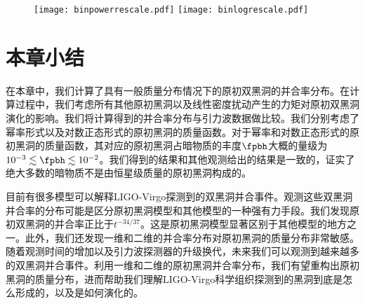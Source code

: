 \begin{figure}[htb]
    \centering
    \texttt{[image: binpowerrescale.pdf]}
    \texttt{[image: binlogrescale.pdf]}
\end{figure}

\section{本章小结}
在本章中，我们计算了具有一般质量分布情况下的原初双黑洞的并合率分布。在计算过程中，我们考虑所有其他原初黑洞以及线性密度扰动产生的力矩对原初双黑洞演化的影响。我们将计算得到的并合率分布与引力波数据做比较。我们分别考虑了幂率形式以及对数正态形式的原初黑洞的质量函数。对于幂率和对数正态形式的原初黑洞的质量函数，其对应的原初黑洞占暗物质的丰度$\fpbh$大概的量级为$10^{-3} \lesssim \fpbh \lesssim 10^{-2}$。我们得到的结果和其他观测\cite{Chen:2016pud,Green:2016xgy,Schutz:2016khr,Wang:2016ana,Gaggero:2016dpq,Ali-Haimoud:2016mbv,Blum:2016cjs,Horowitz:2016lib,Kuhnel:2017pwq,Inoue:2017csr,Carr:2017jsz,Green:2017qoa,Guo:2017njn,Zumalacarregui:2017qqd,Clesse:2016vqa}给出的结果是一致的，证实了绝大多数的暗物质不是由恒星级质量的原初黑洞构成的\cite{Sasaki:2016jop,Ali-Haimoud:2017rtz,Raidal:2017mfl,Kocsis:2017yty}。

目前有很多模型可以解释LIGO-Virgo探测到的双黑洞并合事件。观测这些双黑洞并合率的分布可能是区分原初黑洞模型和其他模型的一种强有力手段。我们发现原初双黑洞的并合率正比于$t^{-34/37}$。这是原初黑洞模型显著区别于其他模型的地方之一。此外，我们还发现一维和二维的并合率分布对原初黑洞的质量分布非常敏感。随着观测时间的增加以及引力波探测器的升级换代，未来我们可以观测到越来越多的双黑洞并合事件。利用一维和二维的原初黑洞并合率分布，我们有望重构出原初黑洞的质量分布，进而帮助我们理解LIGO-Virgo科学组织探测到的黑洞到底是怎么形成的，以及是如何演化的。